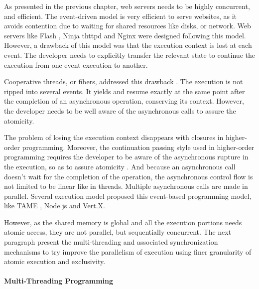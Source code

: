As presented in the previous chapter, web servers needs to be highly concurrent, and efficient.
The event-driven model is very efficient to serve websites, as it avoids contention due to waiting for shared resources like disks, or network.
Web servers like Flash \cite{Pai1999}, Ninja \cite{Gribble2001} thttpd and Nginx were designed following this model.
However, a drawback of this model was that the execution context is lost at each event.
The developer needs to explicitly transfer the relevant state to continue the execution from one event execution to another.

Cooperative threads, or fibers, addressed this drawback \cite{Adya2002,Behren2003a}.
The execution is not ripped into several events.
It yields and resume exactly at the same point after the completion of an asynchronous operation, conserving its context.
However, the developer needs to be well aware of the asynchronous calls to assure the atomicity.

The problem of losing the execution context disappears with closures in higher-order programming.
Moreover, the continuation passing style used in higher-order programming requires the developer to be aware of the asynchronous rupture in the execution, so as to assure atomicity \cite{Sussman1998}.
And because an asynchronous call doesn't wait for the completion of the operation, the asynchronous control flow is not limited to be linear like in threads.
Multiple asynchronous calls are made in parallel.
Several execution model proposed this event-based programming model, like TAME \cite{Krohn2007}, Node.js and Vert.X.

However, as the shared memory is global and all the execution portions needs atomic access, they are not parallel, but sequentially concurrent.
The next paragraph present the multi-threading and associated synchronization mechanisms to try improve the parallelism of execution using finer granularity of atomic execution and exclusivity.

\paragraph{Multi-Threading Programming}

